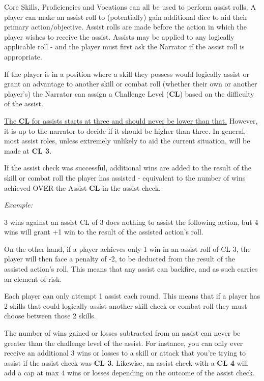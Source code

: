 Core Skills, Proficiencies and Vocations can all be used to perform assist rolls. A player can make an assist roll to (potentially) gain additional dice to aid their primary action/objective. Assist rolls are made before the action in which the player wishes to receive the assist. Assists may be applied to any logically applicable roll - and the player must first ask the Narrator if the assist roll is appropriate.

If the player is in a position where a skill they possess would logically assist or grant an advantage to another skill or combat roll (whether their own or another player’s) the Narrator can assign a Challenge Level (\textbf{CL}) based on the difficulty of the assist.

\underline{The \textbf{CL} for assists starts at three and should never be lower than that.} However, it is up to the narrator to decide if it should be higher than three. In general, most assist roles, unless extremely unlikely to aid the current situation, will be made at \textbf{CL 3}.

If the assist check was successful, additional wins are added to the result of the skill or combat roll the player has assisted - equivalent to the number of wins achieved OVER the Assist \textbf{CL} in the assist check.

\textit{Example:}

\begin{displayquote}
    3 wins against an assist CL of 3 does nothing to assist the following action, but 4 wins will grant +1 win to the result of the assisted action's roll.

    On the other hand, if a player achieves only 1 win in an assist roll of CL 3, the player will then face a penalty of -2, to be deducted from the result of the assisted action's roll. This means that any assist can backfire, and as such carries an element of risk.
\end{displayquote}

Each player can only attempt 1 assist each round. This means that if a player has 2 skills that could logically assist another skill check or combat roll they must choose between those 2 skills.

The number of wins gained or losses subtracted from an assist can never be greater than the challenge level of the assist. For instance, you can only ever receive an additional 3 wins or losses to a skill or attack that you’re trying to assist if the assist check was \textbf{CL 3}. Likewise, an assist check with a \textbf{CL 4} will add a cap at max 4 wins or losses depending on the outcome of the assist check.

